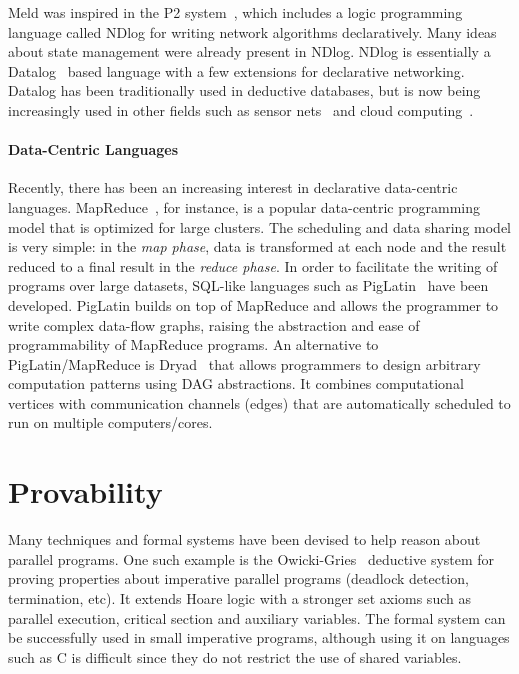 Meld was inspired in the P2 system~\cite{Loo-condie-garofalakis-p2}, which
includes a logic programming language called NDlog for writing network
algorithms declaratively. Many ideas about state management were already present
in NDlog.  NDlog is essentially a Datalog~\cite{Ullman:1990:PDK:533142} based
language with a few extensions for declarative networking. Datalog has been
traditionally used in deductive databases, but is now being increasingly used in
other fields such as sensor nets~\cite{Chu:2007:DID:1322263.1322281} and cloud
computing~\cite{alvaro:boom}.

\paragraph{Data-Centric Languages}

Recently, there has been an increasing interest in declarative data-centric
languages. MapReduce~\cite{Dean:2008:MSD:1327452.1327492}, for instance, is a
popular data-centric programming model that is optimized for large clusters. The
scheduling and data sharing model is very simple: in the \emph{map phase}, data
is transformed at each node and the result reduced to a final result in the
\emph{reduce phase}. In order to facilitate the writing of programs over large
datasets, SQL-like languages such as
PigLatin~\cite{Olston:2008:PLN:1376616.1376726} have been developed. PigLatin
builds on top of MapReduce and allows the programmer to write complex data-flow
graphs, raising the abstraction and ease of programmability of MapReduce
programs. An alternative to PigLatin/MapReduce is
Dryad~\cite{Isard:2007:DDD:1272996.1273005} that allows programmers to design
arbitrary computation patterns using DAG abstractions. It combines computational
vertices with communication channels (edges) that are automatically scheduled to
run on multiple computers/cores.

\section{Provability}

Many techniques and formal systems have been devised to help reason about
parallel programs.  One such example is the
Owicki-Gries~\cite{Owicki:1976:VPP:360051.360224} deductive system for proving
properties about imperative parallel programs (deadlock detection, termination,
etc). It extends Hoare logic with a stronger set axioms such as parallel
execution, critical section and auxiliary variables. The formal system can be
successfully used in small imperative programs, although using it on languages
such as C is difficult since they do not restrict the use of shared variables.


